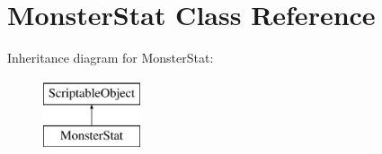 \hypertarget{class_monster_stat}{\section{Monster\-Stat Class Reference}
\label{class_monster_stat}
}
Inheritance diagram for Monster\-Stat\-:\begin{figure}[H]
\begin{center}
\leavevmode
\includegraphics[height=2.000000cm]{class_monster_stat}
\end{center}
\end{figure}
